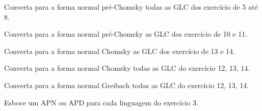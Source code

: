 \begin{problemset}
    \item Converta para a forma normal pré-Chomsky todas as GLC dos exercício de 5 até 8.
    
    \item Converta para a forma normal pré-Chomsky as GLC dos exercício de 10 e 11.
    
    \item Converta para a forma normal Chomsky as GLC dos exercício de 13 e 14.
    
    \item Converta para a forma normal Chomsky todas as GLC do exercício 12, 13, 14.
    
    \item Converta para a forma normal Greibach todas as GLC do exercício 12, 13, 14.
    
    \item Esboce um APN ou APD para cada linguagem do exercício 3.
\end{problemset}